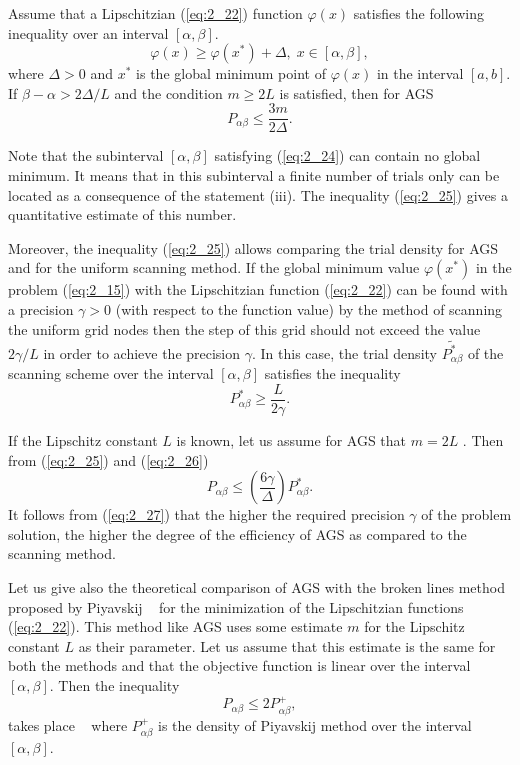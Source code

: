Assume that a Lipschitzian (\ref{eq:2_22}) function $\varphi(x)$ satisfies the following inequality over an interval $[\alpha,\beta]$. 
\begin{equation}
\label{eq:2_24}
\varphi(x)\geq\varphi(x^*)+\Delta,\;x\in [\alpha,\beta],
\end{equation}
where  $\Delta>0$ and $x^*$  is the global minimum point of $\varphi(x)$ in the interval $[a, b]$. If $\beta-\alpha>2\Delta/L$  and the condition $m\geq 2L$  is satisfied, then for AGS ~\cite{2_StrMonRus, 2_StrSergMon2000} 
\begin{equation}
\label{eq:2_25}
P_{\alpha\beta}\leq\frac{3m}{2\Delta}.
\end{equation}

Note that the subinterval $[\alpha,\beta]$ satisfying (\ref{eq:2_24}) can contain no global minimum. It means that in this subinterval a finite number of trials only can be located as a consequence of the statement (iii). The inequality (\ref{eq:2_25}) gives a quantitative estimate of this number. 

Moreover, the inequality (\ref{eq:2_25}) allows comparing the trial density for AGS and for the uniform scanning method. If the global minimum value $\varphi(x^*)$   in the problem (\ref{eq:2_15}) with the Lipschitzian function (\ref{eq:2_22}) can be found with a precision $\gamma>0$  (with respect to the function value) by the  method of scanning  the uniform grid nodes then the step of this grid should not exceed the value $2\gamma/L$  in order to achieve the precision $\gamma$. In this case, the trial density $\tilde{P_{\alpha\beta}^*}$ of the scanning scheme over the interval $[\alpha,\beta]$ satisfies the inequality 
\begin{equation}
\label{eq:2_26}
P_{\alpha\beta}^*\geq \frac{L}{2\gamma}.
\end{equation}

If the Lipschitz constant $L$ is known, let us assume for AGS that $m=2L$ . Then from (\ref{eq:2_25}) and (\ref{eq:2_26})
\begin{equation}
\label{eq:2_27}
P_{\alpha\beta}\leq \left(\frac{6\gamma}{\Delta}\right)P_{\alpha\beta}^*.
\end{equation}
It follows from (\ref{eq:2_27}) that the higher the required precision $\gamma$ of the problem solution, the higher the degree of the efficiency of AGS as compared to the scanning method. 

Let us give also the theoretical comparison of AGS with the broken lines method proposed by Piyavskij ~\cite{2_Piyavskij} for the minimization of the Lipschitzian functions (\ref{eq:2_22}). This method like AGS uses some estimate $m$ for the Lipschitz constant  $L$ as their parameter. Let us assume that this estimate is the same for both the methods and that the objective function is linear over the interval $[\alpha,\beta]$. Then the inequality 
\begin{displaymath}
P_{\alpha\beta}\leq 2P_{\alpha\beta}^+,
\end{displaymath}
takes place ~\cite{2_GrishaginDynSys} where $P_{\alpha\beta}^+$  is the density of Piyavskij method over the interval $[\alpha,\beta]$.
